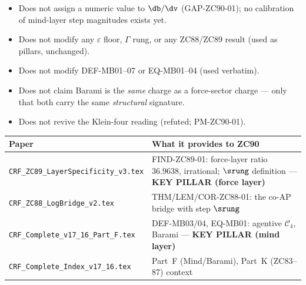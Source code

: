 \documentclass[12pt, a4paper]{article}
\begin{document}
\begin{keybox}[title={What ZC90 Does NOT Do}]
\begin{itemize}[leftmargin=2em, noitemsep]
  \item Does not assign a numeric value to $\db/\dv$ (GAP-ZC90-01);
    no calibration of mind-layer step magnitudes exists yet.
  \item Does not modify any $\varepsilon$ floor, $\Gamma$ rung, or any
    ZC88/ZC89 result (used as pillars, unchanged).
  \item Does not modify DEF-MB01--07 or EQ-MB01--04 (used verbatim).
  \item Does not claim Barami is the \emph{same} charge as a force-sector
    charge --- only that both carry the same \emph{structural} signature.
  \item Does not revive the Klein-four reading (refuted; PM-ZC90-01).
\end{itemize}
\end{keybox}

\begin{keybox}[title={Companion Papers --- ZC90}]
{\footnotesize\renewcommand{\arraystretch}{1.3}
\begin{center}
\begin{tabular}{@{}p{5.6cm}p{6.9cm}@{}}
\toprule
\textbf{Paper} & \textbf{What it provides to ZC90} \\
\midrule
\texttt{CRF\_ZC89\_LayerSpecificity\_v3.tex}
  & FIND-ZC89-01: force-layer ratio $36.9638$, irrational; $\srung$
    definition --- \textbf{KEY PILLAR (force layer)} \\
\texttt{CRF\_ZC88\_LogBridge\_v2.tex}
  & THM/LEM/COR-ZC88-01: the co-AP bridge with step $\srung$ \\
\texttt{CRF\_Complete\_v17\_16\_Part\_F.tex}
  & DEF-MB03/04, EQ-MB01: agentive $\mathcal{C}_4$, Barami ---
    \textbf{KEY PILLAR (mind layer)} \\
\texttt{CRF\_Complete\_Index\_v17\_16.tex}
  & Part~F (Mind/Barami), Part~K (ZC83--87) context \\
\bottomrule
\end{tabular}
\end{center}}
\end{keybox}
\end{document}
